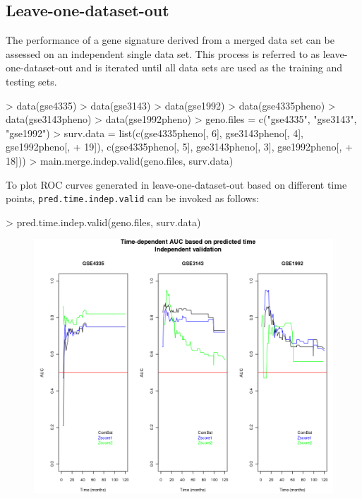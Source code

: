 \documentclass[a4paper]{article}
\begin{document}
\subsection{Leave-one-dataset-out}
The performance of a gene signature derived from a merged data set can be assessed on an independent single data set. This process is referred to as leave-one-dataset-out and is iterated until all data sets are used as the training and testing sets.
\begin{Schunk}
\begin{Sinput}
> data(gse4335)
> data(gse3143)
> data(gse1992)
> data(gse4335pheno)
> data(gse3143pheno)
> data(gse1992pheno)
> geno.files = c("gse4335", "gse3143", "gse1992")
> surv.data = list(c(gse4335pheno[, 6], gse3143pheno[, 4], gse1992pheno[, 
+     19]), c(gse4335pheno[, 5], gse3143pheno[, 3], gse1992pheno[, 
+     18]))
> main.merge.indep.valid(geno.files, surv.data)
\end{Sinput}
\end{Schunk}
To plot ROC curves generated in leave-one-dataset-out based on different time points, \verb+pred.time.indep.valid+ can be invoked as follows:
\begin{Schunk}
\begin{Sinput}
> pred.time.indep.valid(geno.files, surv.data)
\end{Sinput}
\end{Schunk}
\begin{figure}[h]
\begin{center}
\includegraphics{predictTime.png}
\end{center}
\end{figure}
\end{document}
